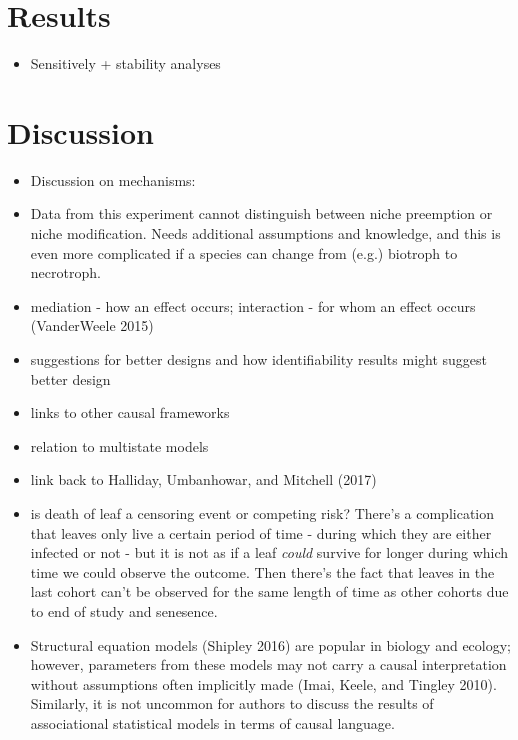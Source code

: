 \documentclass[]{article}
\providecommand{\tightlist}{%
  \setlength{\itemsep}{0pt}\setlength{\parskip}{0pt}}
\begin{document}
\section{Results}\label{results}

\begin{itemize}
\tightlist
\item
  Sensitively + stability analyses
\end{itemize}

\section{Discussion}\label{discussion}

\begin{itemize}
\tightlist
\item
  Discussion on mechanisms:
\item
  Data from this experiment cannot distinguish between niche preemption
  or niche modification. Needs additional assumptions and knowledge, and
  this is even more complicated if a species can change from (e.g.)
  biotroph to necrotroph.
\item
  mediation - how an effect occurs; interaction - for whom an effect
  occurs (VanderWeele 2015)
\item
  suggestions for better designs and how identifiability results might
  suggest better design
\item
  links to other causal frameworks
\item
  relation to multistate models
\item
  link back to Halliday, Umbanhowar, and Mitchell (2017)
\item
  is death of leaf a censoring event or competing risk? There's a
  complication that leaves only live a certain period of time - during
  which they are either infected or not - but it is not as if a leaf
  \emph{could} survive for longer during which time we could observe the
  outcome. Then there's the fact that leaves in the last cohort can't be
  observed for the same length of time as other cohorts due to end of
  study and senesence.
\item
  Structural equation models (Shipley 2016) are popular in biology and
  ecology; however, parameters from these models may not carry a causal
  interpretation without assumptions often implicitly made (Imai, Keele,
  and Tingley 2010). Similarly, it is not uncommon for authors to
  discuss the results of associational statistical models in terms of
  causal language.
\end{itemize}
\end{document}
